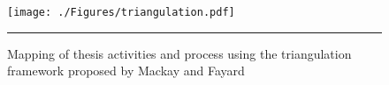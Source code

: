\begin{figure}[t]
	\centering
		\texttt{[image: ./Figures/triangulation.pdf]}
		\rule{35em}{0.5pt}
	\caption[Triangulation]{Mapping of thesis activities and process using the triangulation framework proposed by Mackay and Fayard \cite{mackay_hci_1997}}
	\label{fig:triangulation}
\end{figure}















